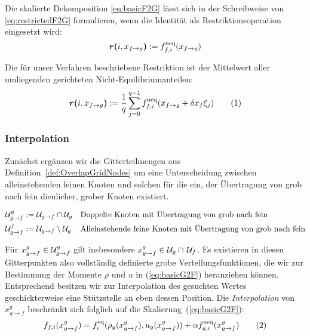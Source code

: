 Die skalierte Dekomposition \ref{eq:basicF2G} lässt sich in der Schreibweise von \ref{eq:restrictedF2G} formulieren, wenn die Identität als Restriktionsoperation eingesetzt wird: \[\boldsymbol{r(}{i}, {x_{f \to g}}\boldsymbol{)} := f_{f,i}^\text{neq}(x_{f \to g})\]

Die für unser Verfahren \cite[Kap.~3.3]{lagrava12} beschriebene Restriktion ist der Mittelwert aller umliegenden gerichteten Nicht-Equilibriumanteilen:
\[\resarg{i}{x_{f \to g}} := \frac{1}{q} \sum_{j=0}^{q-1} f_{f,i}^\text{neq}(x_{f \to g} + \delta x_f \xi_j) \numberthis\label{eq:neqAvgRestrictionF2G}\]

\newpage
\subsubsection{Interpolation}\label{kap:Interpolation}

Zunächst ergänzen wir die Gitterteilmengen aus Definition~\ref{def:OverlapGridNodes} um eine Unterscheidung zwischen alleinstehenden feinen Knoten und solchen für die ein, der Übertragung von grob nach fein dienlicher, grober Knoten existiert.
\begin{Definition}
\begin{align*}
\mathcal{U}_{g \to f}^g &:= \mathcal{U}_{g \to f} \cap \mathcal{U}_g && \text{Doppelte Knoten mit Übertragung von grob nach fein} \\
\mathcal{U}_{g \to f}^f &:= \mathcal{U}_{g \to f} \setminus \mathcal{U}_g && \text{Alleinstehende feine Knoten mit Übertragung von grob nach fein}
\end{align*}
\end{Definition}

Für \(x_{g \to f}^g \in \mathcal{U}_{g \to f}^g\) gilt insbesondere \(x_{g \to f}^g \in \mathcal{U}_g \cap \, \mathcal{U}_f\). Es existieren in diesen Gitterpunkten also vollständig definierte grobe Verteilungsfunktionen, die wir zur Bestimmung der Momente \(\rho\) und \(u\) in (\ref{eq:basicG2F}) heranziehen können. Entsprechend besitzen wir zur Interpolation des gesuchten Wertes geschickterweise eine Stützstelle an eben dessen Position. Die \emph{Interpolation} von \(x_{g \to f}^g\) beschränkt sich folglich auf die Skalierung~(\ref{eq:basicG2F}):
\[f_{f,i}(x_{g \to f}^g) = f_i^\text{eq}(\rho_g(x_{g \to f}^g), u_g(x_{g \to f}^g)) + \alpha f_{g,i}^\text{neq}(x_{g \to f}^g) \numberthis\label{eq:expandedDirectG2F}\]

